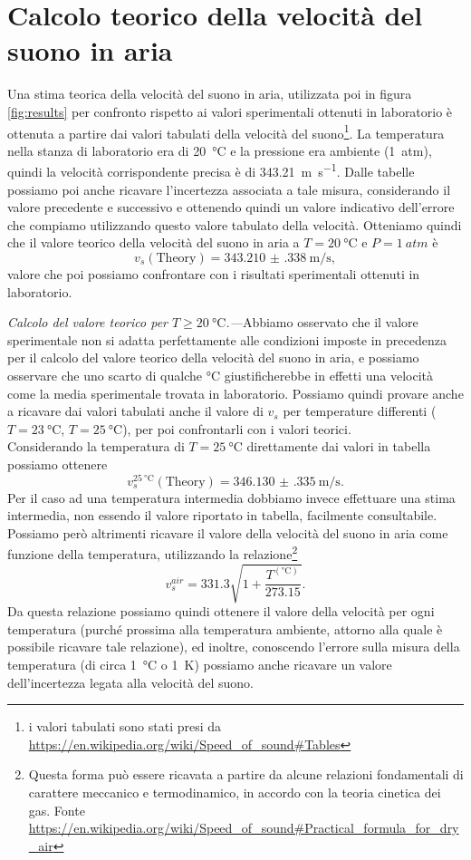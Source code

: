 \documentclass[
    rmp,
    reprint, 
    superscriptaddress, 
    altaffilletter, 
    amsmath, 
    amssymb, 
    a4paper,
    varvw]{revtex4-2}
\begin{document}
\section{Calcolo teorico della velocità del suono in aria}\label{sec:appendix_A}
Una stima teorica della velocità del suono in aria, utilizzata poi in figura \ref{fig:results} per confronto rispetto ai valori sperimentali ottenuti in laboratorio è ottenuta a partire dai valori tabulati della velocità del suono\footnote{i valori tabulati sono stati presi da \url{https://en.wikipedia.org/wiki/Speed_of_sound\#Tables}}. La temperatura nella stanza di laboratorio era di \SI{20}{\celsius} e la pressione era ambiente (\SI{1}{atm}), quindi la velocità corrispondente precisa è di \SI{343.21}{\metre\per\second}. Dalle tabelle possiamo poi anche ricavare l'incertezza associata a tale misura, considerando il valore precedente e successivo e ottenendo quindi un valore indicativo dell'errore che compiamo utilizzando questo valore tabulato della velocità. Otteniamo quindi che il valore teorico della velocità del suono in aria a $T=\SI{20}{\celsius}$ e $P=\SI{1}{atm}$ è \[v_s(\text{Theory}) = \SI{343.210(338)}{\metre\per\second},\] valore che poi possiamo confrontare con i risultati sperimentali ottenuti in laboratorio. 

\noindent\textit{Calcolo del valore teorico per $T \geq \SI{20}{\celsius}$.---}Abbiamo osservato che il valore sperimentale non si adatta perfettamente alle condizioni imposte in precedenza per il calcolo del valore teorico della velocità del suono in aria, e possiamo osservare che uno scarto di qualche \si[]{\celsius} giustificherebbe in effetti una velocità come la media sperimentale trovata in laboratorio. Possiamo quindi provare anche a ricavare dai valori tabulati anche il valore di $v_s$ per temperature differenti ($T=\SI{23}{\celsius}$, $T=\SI{25}{\celsius}$), per poi confrontarli con i valori teorici. \\
Considerando la temperatura di $T=\SI{25}{\celsius}$ direttamente dai valori in tabella possiamo ottenere \[v_s^{\SI{25}{\celsius}}(\text{Theory})=\SI{346.130(335)}{\metre\per\second}.\] 
Per il caso ad una temperatura intermedia dobbiamo invece effettuare una stima intermedia, non essendo il valore riportato in tabella, facilmente consultabile. 
Possiamo però altrimenti ricavare il valore della velocità del suono in aria come funzione della temperatura, utilizzando la relazione\footnote{Questa forma può essere ricavata a partire da alcune relazioni fondamentali di carattere meccanico e termodinamico, in accordo con la teoria cinetica dei gas. Fonte \url{https://en.wikipedia.org/wiki/Speed_of_sound\#Practical_formula_for_dry_air}} \[v_s^{air} = 331.3\sqrt{1+\frac{T^{(\si{\celsius})}}{273.15}}.\] Da questa relazione possiamo quindi ottenere il valore della velocità per ogni temperatura (purché prossima alla temperatura ambiente, attorno alla quale è possibile ricavare tale relazione), ed inoltre, conoscendo l'errore sulla misura della temperatura (di circa \SI{1}{\celsius} o \SI{1}{\kelvin}) possiamo anche ricavare un valore dell'incertezza legata alla velocità del suono. 
\end{document}
